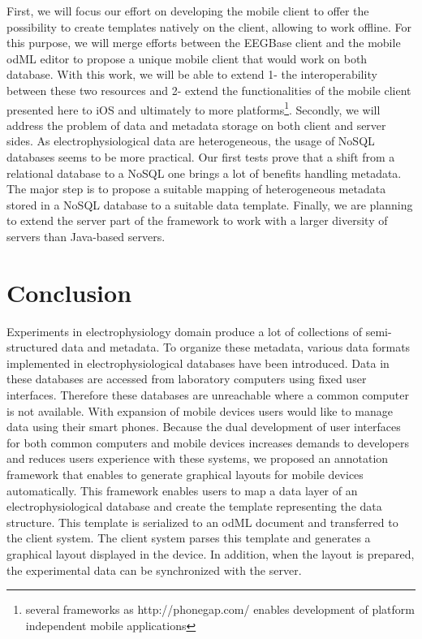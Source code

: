 \documentclass[a4paper,twoside]{article}
\begin{document}
First, we will focus our effort on developing the mobile client to offer the possibility to create templates natively on the client, allowing to work offline. For this purpose, we will merge efforts between the EEGBase client and the mobile odML editor \cite{10.3389/conf.fninf.2014.18.00053} to propose a unique mobile client that would work on both database. With this work, we will be able to extend 1- the interoperability between these two resources and 2- extend the functionalities of the mobile client presented here to iOS and ultimately to more platforms\footnote{several frameworks as http://phonegap.com/ enables development of platform independent mobile applications}.
Secondly, we will address the problem of data and metadata storage on both client and server sides. As electrophysiological data are heterogeneous, the usage of NoSQL databases seems to be more practical. Our first tests prove \cite{Jezek2014422} that a shift from a relational database to a NoSQL one brings a lot of benefits handling metadata. The major step is to propose a suitable mapping of heterogeneous metadata stored in a NoSQL database to a suitable data template. Finally, we are planning to extend the server part of the framework to work with a larger diversity of servers than Java-based servers.



\section{Conclusion}




Experiments in electrophysiology domain produce a lot of collections of semi-structured data and metadata. To organize these metadata, various data formats implemented in electrophysiological databases have been introduced. Data in these databases are accessed from laboratory computers using fixed user interfaces. Therefore these databases are unreachable where a common computer is not available. With expansion of mobile devices users would like to manage data using their smart phones. Because the dual development of user interfaces for both common computers and mobile devices increases demands to developers and reduces users experience with these systems, we proposed an annotation framework that enables to generate graphical layouts for mobile devices automatically. This framework enables users to map a data layer of an electrophysiological database and create the template representing the data structure. This template is serialized to an odML document and transferred to the client system. The client system parses this template and generates a graphical layout displayed in the device. In addition, when the layout is prepared, the experimental data can be synchronized with the server.
\end{document}

